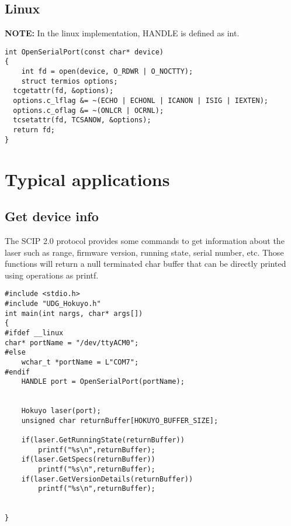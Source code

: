 \documentclass{book}
\begin{document}
\subsection{Linux}
\textbf{NOTE: }In the linux implementation, HANDLE is defined as int.\\
\begin{lstlisting}
int OpenSerialPort(const char* device)
{
	int fd = open(device, O_RDWR | O_NOCTTY);
	struct termios options;
  tcgetattr(fd, &options);
  options.c_lflag &= ~(ECHO | ECHONL | ICANON | ISIG | IEXTEN);
  options.c_oflag &= ~(ONLCR | OCRNL);
  tcsetattr(fd, TCSANOW, &options);
  return fd;
}
\end{lstlisting}
\section{Typical applications}
\subsection{Get device info}
The SCIP 2.0 protocol provides some commands to get information about the laser such as range, firmware version, running state, serial number, etc. Those functions will return a null terminated char buffer that can be directly printed using operations as printf.\\
\begin{lstlisting}
#include <stdio.h>
#include "UDG_Hokuyo.h"
int main(int nargs, char* args[])
{
#ifdef __linux
char* portName = "/dev/ttyACM0";
#else
	wchar_t *portName = L"COM7";
#endif
	HANDLE port = OpenSerialPort(portName);
	
	
	Hokuyo laser(port);
	unsigned char returnBuffer[HOKUYO_BUFFER_SIZE];

	if(laser.GetRunningState(returnBuffer))
		printf("%s\n",returnBuffer);
	if(laser.GetSpecs(returnBuffer))
		printf("%s\n",returnBuffer);
	if(laser.GetVersionDetails(returnBuffer))
		printf("%s\n",returnBuffer);
	
	
}

\end{lstlisting}
\end{document}
